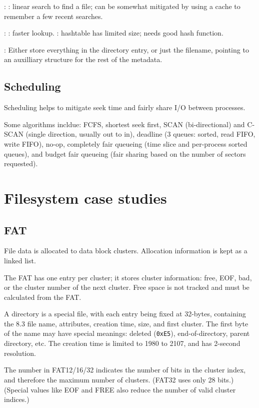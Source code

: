 \documentclass[fontsize=9pt,twoside]{slnotes}
\newcommand\benefits{\checkmark}
\newcommand\problems{\textsymbol{✗}}
\begin{document}
: \problems: linear search to find a file; can be somewhat mitigated by using a cache to remember a few recent searches.

: \benefits: faster lookup. \problems: hashtable has limited size; needs good hash function.

: Either store everything in the directory entry, or just the filename, pointing to an auxilliary structure for the rest of the metadata.

\subsection{Scheduling}
Scheduling helps to mitigate seek time and fairly share I/O between processes.

Some algorithms incldue: FCFS, shortest seek first, SCAN (bi-directional) and C-SCAN (single direction, usually out to in), deadline (3 queues: sorted, read FIFO, write FIFO), no-op, completely fair queueing (time slice and per-process sorted queues), and budget fair queueing (fair sharing based on the number of sectors requested).

\section{Filesystem case studies}
\subsection{FAT}
File data is allocated to data block clusters. Allocation information is kept as a linked list.

The FAT has one entry per cluster; it stores cluster information: free, EOF, bad, or the cluster number of the next cluster. Free space is not tracked and must be calculated from the FAT.

A directory is a special file, with each entry being fixed at 32-bytes, containing the 8.3 file name, attributes, creation time, size, and first cluster. The first byte of the name may have special meanings: deleted (\texttt{0xE5}), end-of-directory, parent directory, etc. The creation time is limited to 1980 to 2107, and has 2-second resolution.

The number in FAT12/16/32 indicates the number of bits in the cluster index, and therefore the maximum number of clusters. (FAT32 uses only 28 bits.) (Special values like EOF and FREE also reduce the number of valid cluster indices.)
\end{document}
